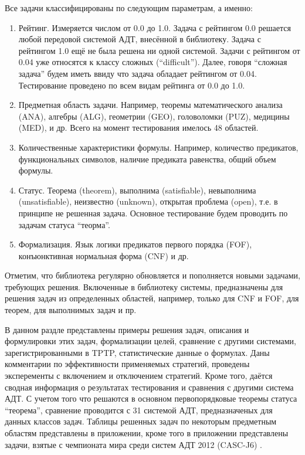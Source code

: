 Все задачи классифицированы по следующим параметрам, а именно:
\begin{enumerate}
\item {Рейтинг.} Измеряется числом от 0.0 до 1.0. Задача с рейтингом 0.0 решается любой передовой системой АДТ, внесённой в библиотеку. Задача с рейтингом 1.0 ещё не была решена ни одной системой. Задачи с рейтингом от 0.04 уже относятся к классу сложных (``difficult''). Далее, говоря ``сложная задача'' будем иметь ввиду что задача обладает рейтингом от 0.04. Тестирование проведено по всем видам рейтинга от 0.0 до 1.0.
\item {Предметная область задачи.} Например, теоремы математического анализа (ANA), алгебры (ALG), геометрии (GEO), головоломки (PUZ), медицины (MED), и др. Всего на момент тестирования имелось 48 областей.
\item {Количественные характеристики формулы.} Например, количество предикатов, функциональных символов, наличие предиката равенства, общий объем формулы.
\item {Статус.} Теорема (theorem), выполнима (satisfiable), невыполнима (unsatisfiable), неизвестно (unknown), открытая проблема (open), т.е. в принципе не решенная задача. Основное тестирование будем проводить по задачам статуса ``теорма''.
\item {Формализация.} Язык логики предикатов первого порядка (FOF), конъюнктивная нормальная форма (CNF) и др.
\end{enumerate}

Отметим, что библиотека регулярно обновляется и пополняется новыми задачами, требующих решения. Включенные в библиотеку системы, предназначены для решения задач из определенных областей, например, только для CNF и FOF, для теорем, для выполнимых задач и пр.

В данном раздле представлены примеры решения задач, описания и формулировки этих задач, формализации целей, сравнение с другими системами, зарегистрированными в TPTP, статистические данные о формулах. Даны комментарии по эффективности применяемых стратегий, проведены эксперементы с включением и отключением стратегий. Кроме того, даётся сводная информация о результатах тестирования и сравнения с другими система АДТ. С учетом того что решаются в основном первопорядковые теоремы статуса ``теорема'', сравнение проводится с 31 системой АДТ, предназначеных для данных классов задач. Таблицы решенных задач по некоторым предметным областям представлены в приложении, кроме того в приложении представлены задачи, взятые с чемпионата мира среди систем АДТ 2012 (CASC-J6) \cite{CASC}.



